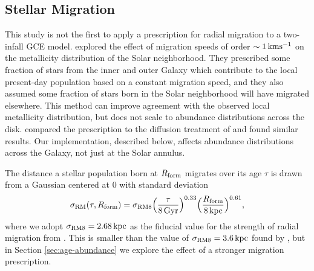 \documentclass[twocolumn,twocolappendix,linenumbers]{aastex631}
\newcommand{\kpc}{\,{\rm kpc}}
\begin{document}
\subsection{Stellar Migration}
\label{sec:migration}

This study is not the first to apply a prescription for radial migration to a two-infall GCE model. \citet{spitoni_effect_2015} explored the effect of migration speeds of order $\sim1\,{\rm km}{\rm s}^{-1}$ on the metallicity distribution of the Solar neighborhood. They prescribed some fraction of stars from the inner and outer Galaxy which contribute to the local present-day population based on a constant migration speed, and they also assumed some fraction of stars born in the Solar neighborhood will have migrated elsewhere. This method can improve agreement with the observed local metallicity distribution, but does not scale to abundance distributions across the disk. \citet{palla_mgfe_2022} compared the \citet{spitoni_effect_2015} prescription to the diffusion treatment of \citet{frankel_measuring_2018} and found similar results. Our implementation, described below, affects abundance distributions across the Galaxy, not just at the Solar annulus.


The distance a stellar population born at $R_{\rm form}$ migrates over its age $\tau$ is drawn from a Gaussian centered at 0 with standard deviation
\begin{equation}
    \sigma_{\rm RM}(\tau,R_{\rm form}) = \sigma_{\rm RM8} \Big(\frac{\tau}{8\,{\rm Gyr}}\Big)^{0.33} \Big(\frac{R_{\rm form}}{8\kpc}\Big)^{0.61},
    \label{eq:radial-migration}
\end{equation}
where we adopt $\sigma_{\rm RM8}=2.68\kpc$ as the fiducial value for the strength of radial migration from \citet{dubay_galactic_2024}. This is smaller than the value of $\sigma_{\rm RM8}=3.6\kpc$ found by \citet{frankel_measuring_2018}, but in Section \ref{sec:age-abundance} we explore the effect of a stronger migration prescription.
\end{document}

